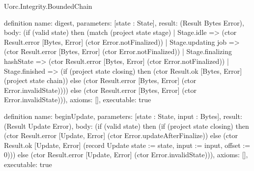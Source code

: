 \begin{lexlean}{Uorc.Integrity.BoundedChain}
\begin{semanticmodule}
definition{
  name: digest,
  parameters: [state : State],
  result: (Result Bytes Error),
  body: (if (valid state) then (match (project state stage)
    | Stage.idle => (ctor Result.error [Bytes, Error] (ctor Error.notFinalized))
    | Stage.updating job => (ctor Result.error [Bytes, Error] (ctor Error.notFinalized))
    | Stage.finalizing hashState => (ctor Result.error [Bytes, Error] (ctor Error.notFinalized))
    | Stage.finished => (if (project state closing) then (ctor Result.ok [Bytes, Error] (project state chain)) else (ctor Result.error [Bytes, Error] (ctor Error.invalidState)))) else (ctor Result.error [Bytes, Error] (ctor Error.invalidState))),
  axioms: [],
  executable: true
}

definition{
  name: beginUpdate,
  parameters: [state : State, input : Bytes],
  result: (Result Update Error),
  body: (if (valid state) then (if (project state closing) then (ctor Result.error [Update, Error] (ctor Error.updateAfterFinalize)) else (ctor Result.ok [Update, Error] (record Update {state := state, input := input, offset := 0}))) else (ctor Result.error [Update, Error] (ctor Error.invalidState))),
  axioms: [],
  executable: true
}


\end{semanticmodule}
\end{lexlean}
